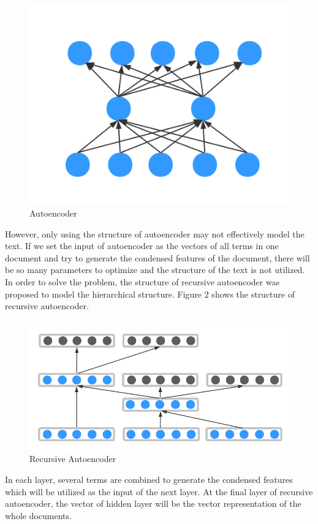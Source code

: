 \documentclass[dvips,9pt]{article}
\begin{document}
\begin{figure}[ht]
\centering
\includegraphics[width = 0.8\linewidth]{figure/autoencoder}
\caption{Autoencoder}
\label{fig:ae}
\end{figure}

However, only using the structure of autoencoder may not effectively model the text. If we set the input of autoencoder as the vectors of all terms in one document and try to generate the condensed features of the document, there will be so many parameters to optimize and the structure of the text is not utilized. In order to solve the problem, the structure of recursive autoencoder was proposed to model the hierarchical structure. Figure 2 shows the structure of recursive autoencoder.
\begin{figure}[ht]
\centering
\includegraphics[width = 1.0\linewidth]{figure/recursiveautoencoder}
\caption{Recursive Autoencoder}
\label{fig:rae}
\end{figure}


In each layer, several terms are combined to generate the condensed features which will be utilized as the input of the next layer. At the final layer of recursive autoencoder, the vector of hidden layer will be the vector representation of the whole documents.
\end{document}

